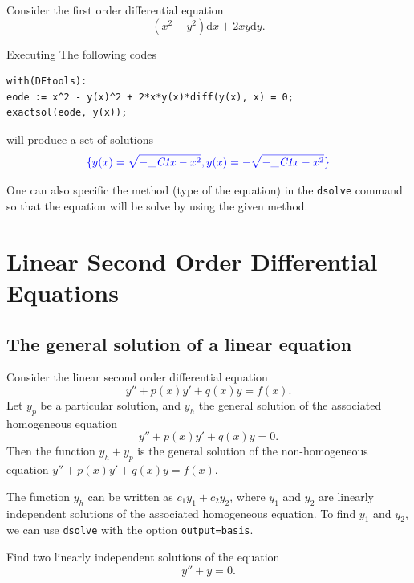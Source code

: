 \documentclass[
  12pt]{elegantbook}
\begin{document}
\begin{example}
Consider the first order differential equation
\[(x^2 - y^2)\mathrm{d} x + 2xy\mathrm{d} y.\]

Executing The following codes

\begin{verbatim}
with(DEtools):
eode := x^2 - y(x)^2 + 2*x*y(x)*diff(y(x), x) = 0;
exactsol(eode, y(x));
\end{verbatim}

will produce a set of solutions
\[
\color{blue}{
\{y(x) = \sqrt{-\_\textit{C1} x -x^{2}},
y(x) = -\sqrt{-\_\textit{C1} x -x^{2}}\}
}
\]
\end{example}

One can also specific the method (type of the equation) in the \texttt{dsolve} command so that the equation will be solve by using the given method.

\hypertarget{linear-second-order-differential-equations}{%
\chapter{Linear Second Order Differential Equations}\label{linear-second-order-differential-equations}}

\hypertarget{the-general-solution-of-a-linear-equation}{%
\section{The general solution of a linear equation}\label{the-general-solution-of-a-linear-equation}}

Consider the linear second order differential equation
\[y''+p(x)y'+q(x)y=f(x).\]
Let \(y_p\) be a particular solution, and \(y_h\) the general solution of the associated homogeneous equation
\[y''+p(x)y'+q(x)y=0.\]
Then the function \(y_h+y_p\) is the general solution of the non-homogeneous equation \(y''+p(x)y'+q(x)y=f(x)\).

The function \(y_h\) can be written as \(c_1y_1+c_2y_2\), where \(y_1\) and \(y_2\) are linearly independent solutions of the associated homogeneous equation. To find \(y_1\) and \(y_2\), we can use \texttt{dsolve} with the option \texttt{output=basis}.

\begin{example}
Find two linearly independent solutions of the equation
\[y''+ y=0.\]
\end{example}
\end{document}
